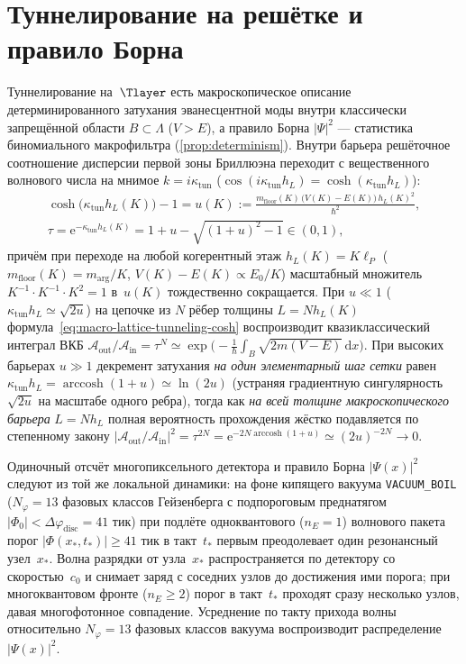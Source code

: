 \section{Туннелирование на решётке и правило Борна}
\label{sec:macro-tunneling-born}

Туннелирование на~$\Tlayer$ есть макроскопическое описание детерминированного затухания эванесцентной моды внутри классически запрещённой области $B\subset\Lambda$ ($V > E$), а правило Борна $|\Psi|^2$ --- статистика биномиального макрофильтра (\cref{prop:determinism}).
Внутри барьера решёточное соотношение дисперсии первой зоны Бриллюэна переходит с вещественного волнового числа на мнимое $k = i\kappa_{\mathrm{tun}}$ ($\cos(i\kappa_{\mathrm{tun}}h_L) = \cosh(\kappa_{\mathrm{tun}}h_L)$):
\begin{gather}
\label{eq:macro-lattice-tunneling-cosh}
  \cosh\bigl(\kappa_{\mathrm{tun}}h_L(K)\bigr) - 1
  = u(K)
  := \frac{m_{\mathrm{floor}}(K)\,\bigl(V(K)-E(K)\bigr)\,h_L(K)^2}{\hbar^2},\\
  \tau = \mathrm{e}^{-\kappa_{\mathrm{tun}}h_L(K)} = 1 + u - \sqrt{(1+u)^2 - 1} \in (0,1),\nonumber
\end{gather}
причём при переходе на любой когерентный этаж $h_L(K) = K\ell_P$ ($m_{\mathrm{floor}}(K)=m_{\mathrm{arg}}/K$, $V(K)-E(K)\propto E_0/K$) масштабный множитель $K^{-1}\cdot K^{-1}\cdot K^2 = 1$ в~$u(K)$ тождественно сокращается.
При $u \ll 1$ ($\kappa_{\mathrm{tun}}h_L \simeq \sqrt{2u}$) на цепочке из $N$ рёбер толщины $L = Nh_L(K)$ формула~\eqref{eq:macro-lattice-tunneling-cosh} воспроизводит квазиклассический интеграл ВКБ $\mathcal{A}_{\mathrm{out}}/\mathcal{A}_{\mathrm{in}} = \tau^N \simeq \exp\!\bigl(-\frac{1}{\hbar}\int_B\sqrt{2m(V-E)}\,\mathrm{d}x\bigr)$.
При высоких барьерах $u \gg 1$ декремент затухания \emph{на один элементарный шаг сетки} равен $\kappa_{\mathrm{tun}}h_L = \operatorname{arccosh}(1+u) \simeq \ln(2u)$ (устраняя градиентную сингулярность $\sqrt{2u}$ на масштабе одного ребра), тогда как \emph{на всей толщине макроскопического барьера} $L = Nh_L$ полная вероятность прохождения жёстко подавляется по степенному закону $|\mathcal{A}_{\mathrm{out}}/\mathcal{A}_{\mathrm{in}}|^2 = \tau^{2N} = \mathrm{e}^{-2N\operatorname{arccosh}(1+u)} \simeq (2u)^{-2N} \to 0$.

Одиночный отсчёт многопиксельного детектора и правило Борна $|\Psi(x)|^2$ следуют из той же локальной динамики: на фоне кипящего вакуума \texttt{VACUUM\_BOIL} ($N_\varphi = 13$ фазовых классов Гейзенберга с подпороговым преднатягом $|\Phi_0| < \Delta\varphi_{\mathrm{disc}} = 41$ тик) при подлёте одноквантового ($n_E = 1$) волнового пакета порог $|\Phi(x_*,t_*)| \ge 41$ тик в такт~$t_*$ первым преодолевает один резонансный узел~$x_*$. Волна разрядки от узла~$x_*$ распространяется по детектору со скоростью~$c_0$ и снимает заряд с соседних узлов до достижения ими порога; при многоквантовом фронте ($n_E \ge 2$) порог в такт~$t_*$ проходят сразу несколько узлов, давая многофотонное совпадение. Усреднение по такту прихода волны относительно $N_\varphi = 13$ фазовых классов вакуума воспроизводит распределение $|\Psi(x)|^2$.

